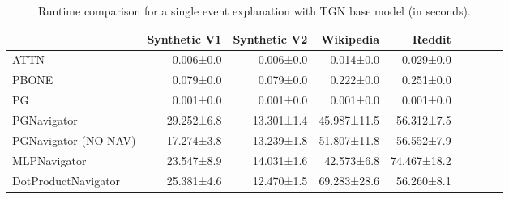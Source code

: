 \begin{table}
\caption{Runtime comparison for a single event explanation with TGN base model (in seconds).}
\label{tab:tgn_runtime_single}
\begin{tabular}{lrrrrrrrr}
\toprule
 & Synthetic V1 & Synthetic V2 & Wikipedia & Reddit \\
\midrule
ATTN & 0.006±0.0 & 0.006±0.0 & 0.014±0.0 & 0.029±0.0 \\
PBONE & 0.079±0.0 & 0.079±0.0 & 0.222±0.0 & 0.251±0.0 \\
PG & 0.001±0.0 & 0.001±0.0 & 0.001±0.0 & 0.001±0.0 \\
PGNavigator & 29.252±6.8 & 13.301±1.4 & 45.987±11.5 & 56.312±7.5 \\
PGNavigator (NO NAV) & 17.274±3.8 & 13.239±1.8 & 51.807±11.8 & 56.552±7.9 \\
MLPNavigator & 23.547±8.9 & 14.031±1.6 & 42.573±6.8 & 74.467±18.2 \\
DotProductNavigator & 25.381±4.6 & 12.470±1.5 & 69.283±28.6 & 56.260±8.1 \\
\bottomrule
\end{tabular}
\end{table}
